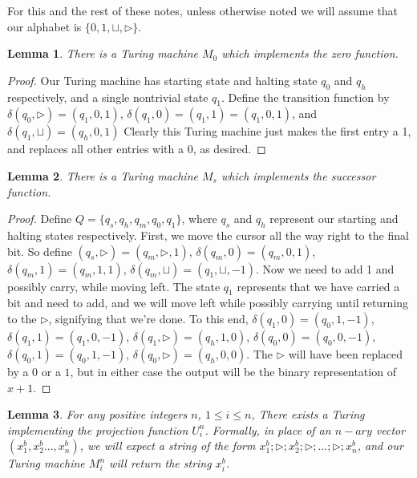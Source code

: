 \documentclass{article}
\theoremstyle{definition}
\theoremstyle{plain}
\theoremstyle{theorem}
\newtheorem{lemma}{Lemma}[section]
\begin{document}
\par For this and the rest of these notes, unless otherwise noted we will assume that our alphabet is $\{0,1,\sqcup,\triangleright\}$.
\begin{lemma}
    There is a Turing machine $M_0$ which implements the zero function.
\end{lemma}
\begin{proof}
     Our Turing machine has starting state and halting state $q_0$ and $q_h$ respectively, and a single nontrivial state $q_1$. Define the transition function by $\delta(q_0,\triangleright) = (q_1,0,1)$, $\delta(q_1,0)=(q_1,1) = (q_1,0,1)$, and $\delta(q_1,\sqcup) = (q_h,0,1)$ Clearly this Turing machine just makes the first entry a 1, and replaces all other entries with a 0, as desired.
\end{proof}
\begin{lemma}
    There is a Turing machine $M_s$ which implements the successor function. 
\end{lemma}
\begin{proof}
    Define $Q=\{q_s,q_h,q_m,q_0,q_1\}$, where $q_s$ and $q_h$ represent our starting and halting states respectively. 
    First, we move the cursor all the way right to the final bit. So define $(q_s,\triangleright) = (q_m,\triangleright,1)$, $\delta(q_m,0)=(q_m,0,1)$, $\delta(q_m,1)=(q_m,1,1)$, $\delta(q_m,\sqcup)=(q_1,\sqcup,-1)$. Now we need to add 1 and possibly carry, while moving left. The state $q_1$ represents that we have carried a bit and need to add, and we will move left while possibly carrying until returning to the $\triangleright$, signifying that we're done. To this end, $\delta(q_1,0)=(q_0,1,-1)$, $\delta(q_1,1)=(q_1,0,-1)$, $\delta(q_1,\triangleright)=(q_h,1,0)$, $\delta(q_0,0)=(q_0,0,-1)$, $\delta(q_0,1)=(q_0,1,-1)$, $\delta(q_0,\triangleright)=(q_h,0,0)$. The $\triangleright$ will have been replaced by a $0$ or a $1$, but in either case the output will be the binary representation of $x+1$. 
\end{proof}
\begin{lemma}
    For any positive integers $n$, $1 \leq i\leq n$, There exists a Turing implementing the projection function $U_i^n$. Formally, in place of an $n-ary$ vector $(x_1^b,x_2^b...,x_n^b)$, we will expect a string of the form $x_1^b;\triangleright;x_2^b;\triangleright;...;\triangleright;x_n^b$, and our Turing machine $M_i^n$ will return the string $x_i^b$.
\end{lemma}
\end{document}
